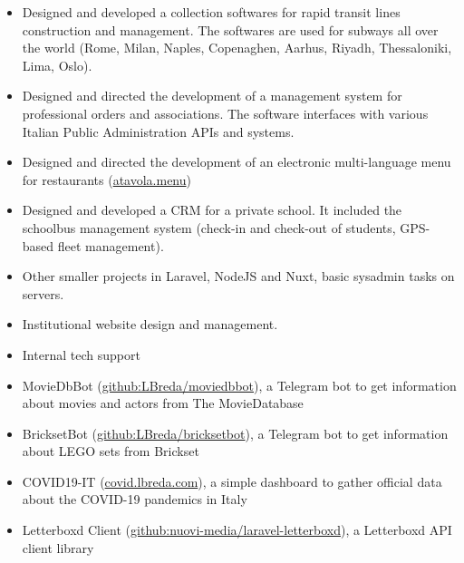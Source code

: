\documentclass[10pt,a4paper]{altacv}
\begin{document}
\begin{itemize}
\item Designed and developed a collection softwares for rapid transit lines construction and management. The softwares are used for subways all over the world (Rome, Milan, Naples, Copenaghen, Aarhus, Riyadh, Thessaloniki, Lima, Oslo).
\item Designed and directed the development of a management system for professional orders and associations. The software interfaces with various Italian Public Administration APIs and systems.
\item Designed and directed the development of an electronic multi-language menu for restaurants (\href{https://atavola.menu}{atavola.menu})
\item Designed and developed a CRM for a private school. It included the schoolbus management system (check-in and check-out of students, GPS-based fleet management).
\item Other smaller projects in Laravel, NodeJS and Nuxt, basic sysadmin tasks on servers.
\end{itemize}

\divider

\begin{itemize}
\item Institutional website design and management.
\item Internal tech support
\end{itemize}

\pagebreak

\begin{itemize}
\item MovieDbBot (\href{https://github.com/LBreda/moviedbbot}{github:LBreda/moviedbbot}), a Telegram bot to get information about movies and actors from The MovieDatabase
\item BricksetBot (\href{https://github.com/LBreda/bricksetbot}{github:LBreda/bricksetbot}), a Telegram bot to get information about LEGO sets from Brickset
\item COVID19-IT (\href{https://covid19.lbreda.com/}{covid.lbreda.com}), a simple dashboard to gather official data about the COVID-19 pandemics in Italy
\item Letterboxd Client (\href{https://github.com/nuovi-media/laravel-letterboxd}{github:nuovi-media/laravel-letterboxd}), a Letterboxd API client library
\end{itemize}
\end{document}

